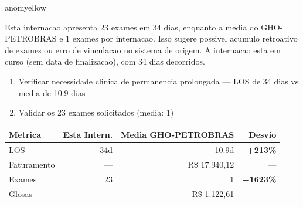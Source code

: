 \documentclass[a4paper,10pt]{article}
\begin{document}
\begin{anomalycard}[Internacao 165786 | GHO-PETROBRAS | MODERADO (z=2.42)]{anomyellow}
\vspace{2pt}\begin{tcolorbox}[colback=severityred!20,colframe=anomyellow,title={\textbf{Interpretacao de Negocio}},fonttitle=\bfseries\small,left=4pt,right=4pt,top=3pt,bottom=3pt]
{\small Esta internacao apresenta 23 exames em 34 dias, enquanto a media do GHO-PETROBRAS e 1 exames por internacao. Isso sugere possivel acumulo retroativo de exames ou erro de vinculacao no sistema de origem. A internacao esta em curso (sem data de finalizacao), com 34 dias decorridos.}
\end{tcolorbox}
\begin{tcolorbox}[colback=severityyellow!30,colframe=anomorange,title={\textbf{Recomendacoes Especificas}},fonttitle=\bfseries\small,left=4pt,right=4pt,top=3pt,bottom=3pt]
\begin{enumerate}[nosep,leftmargin=16pt]
\item {\small Verificar necessidade clinica de permanencia prolongada --- LOS de 34 dias vs media de 10.9 dias}
\item {\small Validar os 23 exames solicitados (media: 1)}
\end{enumerate}
\end{tcolorbox}
\begin{center}\begin{tabular}{l r r r}\toprule\textbf{Metrica} & \textbf{Esta Intern.} & \textbf{Media GHO-PETROBRAS} & \textbf{Desvio} \\\midrule
LOS & 34d & 10.9d & \textcolor{anomred}{\textbf{+213\%}} \\
Faturamento & --- & R\$ 17.940,12 & --- \\
Exames & 23 & 1 & \textcolor{anomred}{\textbf{+1623\%}} \\
Glosas & --- & R\$ 1.122,61 & --- \\
\bottomrule\end{tabular}\end{center}


\end{anomalycard}
\end{document}
